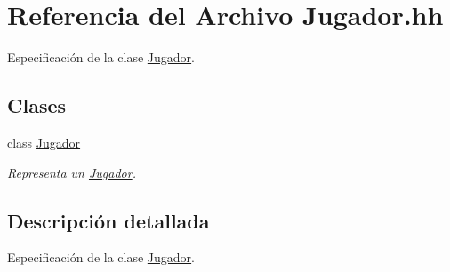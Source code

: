 \hypertarget{_jugador_8hh}{}\section{Referencia del Archivo Jugador.\+hh}
\label{_jugador_8hh}


Especificación de la clase \mbox{\hyperlink{class_jugador}{Jugador}}.  


\subsection*{Clases}
\begin{DoxyCompactItemize}
\item 
class \mbox{\hyperlink{class_jugador}{Jugador}}
\begin{DoxyCompactList}\small\item\em Representa un \mbox{\hyperlink{class_jugador}{Jugador}}. \end{DoxyCompactList}\end{DoxyCompactItemize}


\subsection{Descripción detallada}
Especificación de la clase \mbox{\hyperlink{class_jugador}{Jugador}}. 

